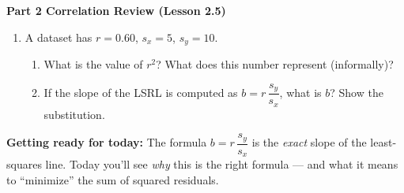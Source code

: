 \documentclass[10pt]{article}
\begin{document}
\vspace{0.22in}

{\large\bfseries\color{navy} Part 2 \quad Correlation Review (Lesson 2.5)}

\vspace{0.12in}

\begin{enumerate}[leftmargin=1.6em, itemsep=0.18in, start=3]

  \item A dataset has $r = 0.60$, $s_x = 5$, $s_y = 10$.

        \begin{enumerate}[label=\textbf{(\alph*)}, leftmargin=1.6em, itemsep=6pt]
          \item What is the value of $r^2$?  What does this number represent (informally)?\\[8pt]

          \item If the slope of the LSRL is computed as $b = r\,\dfrac{s_y}{s_x}$, what is $b$?
                Show the substitution.\\[8pt]
        \end{enumerate}

\end{enumerate}

\vspace{0.14in}

\begin{tcolorbox}[colback=greenbg, colframe=greenacc, boxrule=0.8pt, arc=2mm,
    left=4mm, right=4mm, top=3mm, bottom=3mm]
\small\textbf{Getting ready for today:} The formula $b = r\,\dfrac{s_y}{s_x}$ is the
\emph{exact} slope of the least-squares line. Today you'll see \emph{why} this is the right
formula --- and what it means to ``minimize'' the sum of squared residuals.
\end{tcolorbox}
\end{document}
